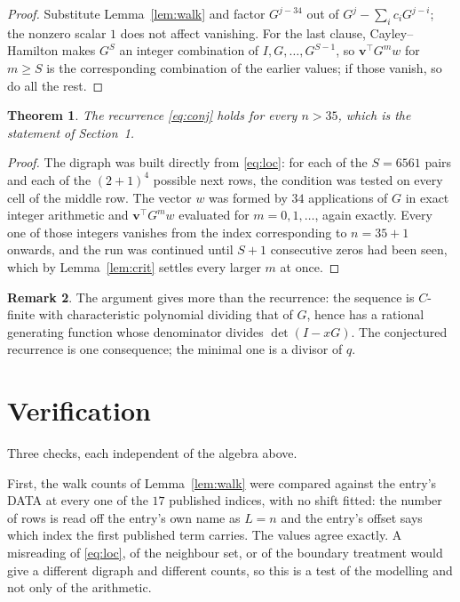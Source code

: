 \documentclass[11pt,a4paper]{article}
\theoremstyle{plain}
\newtheorem{theorem}{Theorem}
\theoremstyle{definition}
\newtheorem{remark}[theorem]{Remark}
\begin{document}
\begin{proof}
Substitute Lemma~\ref{lem:walk} and factor $G^{j-34}$ out of
$G^{j}-\sum_ic_iG^{j-i}$; the nonzero scalar $1$ does not affect
vanishing. For the last clause, Cayley--Hamilton makes $G^{S}$ an integer combination of
$I,G,\dots,G^{S-1}$, so $\mathbf{v}^{\!\top}G^{m}w$ for $m\ge S$ is the corresponding
combination of the earlier values; if those vanish, so do all the rest.
\end{proof}

\begin{theorem}
The recurrence \eqref{eq:conj} holds for every $n>35$, which is the statement of
Section~1.
\end{theorem}

\begin{proof}
The digraph was built directly from \eqref{eq:loc}: for each of the $S=6561$ pairs and each
of the $(2+1)^{4}$ possible next rows, the condition was tested on every cell of
the middle row. The vector $w$ was formed by $34$ applications of $G$ in exact integer
arithmetic and $\mathbf{v}^{\!\top}G^{m}w$ evaluated for $m=0,1,\dots$, again exactly.
Every one of those integers vanishes from the index corresponding to $n=35+1$ onwards,
and the run was continued until $S+1$ consecutive zeros had been seen, which by
Lemma~\ref{lem:crit} settles every larger $m$ at once.
\end{proof}

\begin{remark}
The argument gives more than the recurrence: the sequence is $C$-finite with characteristic
polynomial dividing that of $G$, hence has a rational generating function whose denominator
divides $\det(I-xG)$. The conjectured recurrence is one consequence; the minimal one is a
divisor of $q$.
\end{remark}

\section{Verification}

Three checks, each independent of the algebra above.

First, the walk counts of Lemma~\ref{lem:walk} were compared against the entry's DATA at
every one of the $17$ published indices, with no shift fitted: the number of rows is
read off the entry's own name as $L=n$ and the entry's offset says which index the first
published term carries. The values agree exactly. A misreading of \eqref{eq:loc}, of the
neighbour set, or of the boundary treatment would give a different digraph and different
counts, so this is a test of the modelling and not only of the arithmetic.
\end{document}
